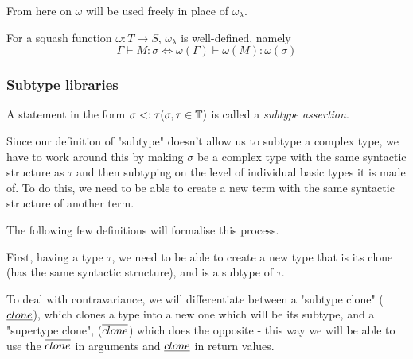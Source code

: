 \documentclass[main.tex]{subfiles}
\begin{document}
From here on $\omega$ will be used freely in place of $\omega_{\lambda}$.

\begin{prop}
    For a squash function $\omega: T \rightarrow S$, $\omega_{\lambda}$ is
    well-defined, namely
    \[ \Gamma \vdash M : \sigma \iff \omega(\Gamma) \vdash \omega(M) : \omega(\sigma) \]
\end{prop}

\subsubsection{Subtype libraries}
\begin{defn}
    A statement in the form $\sigma <: \tau (\sigma, \tau \in \mathbb{T})$
    is called a \emph{subtype assertion}.
\end{defn}

Since our definition of "subtype" doesn't allow us to subtype a complex type,
we have to work around this by making $\sigma$ be a complex type with the same
syntactic structure as $\tau$ and then subtyping on the level of individual
basic types it is made of. To do this, we need to be able to create a new term
with the same syntactic structure of another term.


The following few definitions will formalise this process.

First, having a type $\tau$, we need to be able to create a new type
that is its clone
(has the same syntactic structure), and is a subtype of $\tau$.

To deal with contravariance, we will differentiate between a "subtype clone"
($\underline{clone}$),
which clones a type into a new one which will be its subtype, and a
"supertype clone", ($\overline{clone}$)
which does the opposite - this way we will be able to
use the $\overline{clone}$ in arguments and $\underline{clone}$ in return
values.
\end{document}
